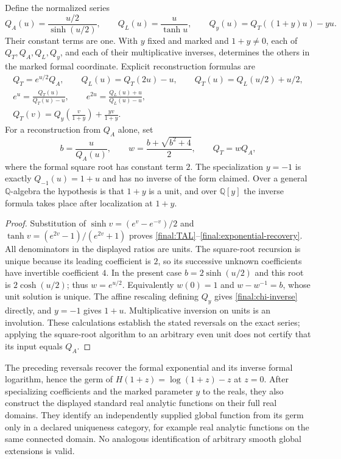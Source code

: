 \begin{theorem}
\label{final:F2}
Define the normalized series
\[
 Q_A(u)=\frac{u/2}{\sinh(u/2)},\qquad
 Q_L(u)=\frac{u}{\tanh u},\qquad
 Q_y(u)=Q_T((1+y)u)-yu.
\]
Their constant terms are one.  With $y$ fixed and marked and
$1+y\ne0$, each of $Q_T,Q_A,Q_L,Q_y$, and each of their multiplicative
inverses, determines the others in the marked formal coordinate.
Explicit reconstruction formulas are
\begin{gather}
 Q_T=e^{u/2}Q_A,\qquad Q_L(u)=Q_T(2u)-u,
 \qquad Q_T(u)=Q_L(u/2)+u/2,\label{final:TAL}\\
 e^u=\frac{Q_T(u)}{Q_T(u)-u},\qquad
 e^{2u}=\frac{Q_L(u)+u}{Q_L(u)-u},\label{final:exponential-recovery}\\
 Q_T(v)=Q_y\left(\frac{v}{1+y}\right)+\frac{yv}{1+y}.
 \label{final:chi-inverse}
\end{gather}
For a reconstruction from $Q_A$ alone, set
\[
 b=\frac{u}{Q_A(u)},\qquad
 w=\frac{b+\sqrt{b^2+4}}{2},\qquad Q_T=wQ_A,
\]
where the formal square root has constant term $2$.
The specialization $y=-1$ is exactly $Q_{-1}(u)=1+u$ and has no
inverse of the form claimed.  Over a general $\mathbb Q$-algebra the
hypothesis is that $1+y$ is a unit, and over $\mathbb Q[y]$ the
inverse formula takes place after localization at $1+y$.
\end{theorem}

\begin{proof}
Substitution of $\sinh v=(e^v-e^{-v})/2$ and
$\tanh v=(e^{2v}-1)/(e^{2v}+1)$ proves
\eqref{final:TAL}--\eqref{final:exponential-recovery}.  All denominators
in the displayed ratios are units.  The square-root recursion is
unique because its leading coefficient is $2$, so its successive
unknown coefficients have invertible coefficient $4$.  In the present
case $b=2\sinh(u/2)$ and this root is $2\cosh(u/2)$; thus $w=e^{u/2}$.
Equivalently $w(0)=1$ and $w-w^{-1}=b$, whose unit solution is unique.
The affine rescaling defining $Q_y$ gives \eqref{final:chi-inverse}
directly, and $y=-1$ gives $1+u$.  Multiplicative inversion on units
is an involution.  These calculations establish the stated reversals
on the exact series; applying the square-root algorithm to an
arbitrary even unit does not certify that its input equals $Q_A$.
\end{proof}

\begin{proposition}
\label{final:F3}
The preceding reversals recover the formal exponential and its inverse
formal logarithm, hence the germ of $H(1+z)=\log(1+z)-z$ at $z=0$.
After specializing coefficients and the marked parameter $y$ to
the reals, they also construct the displayed standard real analytic functions
on their full real domains.  They identify an independently supplied
global function from its germ only in a declared uniqueness category,
for example real analytic functions on the same connected domain.
No analogous identification of arbitrary smooth global extensions is
valid.
\end{proposition}


